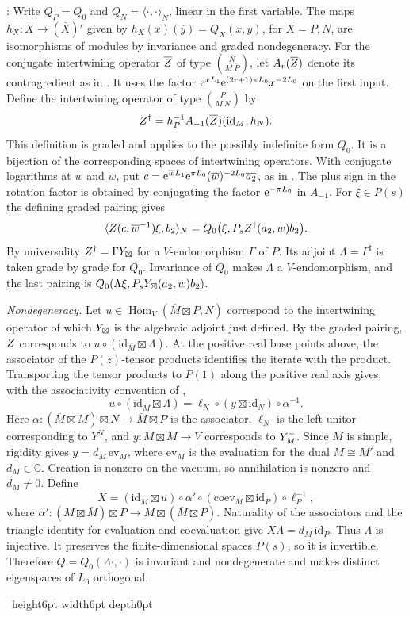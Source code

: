 \documentclass[leqno]{article}
\newcommand{\Cbb}{\ensuremath{\mathbb{C}}}
\let\cal\relax
\newcommand{\cal}{\mathcal}
\newcommand{\qed}{\hfill \vrule height6pt  width6pt depth0pt}
\newcommand{\ovl}{\overline}
\let\i\relax %
\newcommand{\i}{\mathrm{i}}
\newcommand{\e}{\mathrm{e}} %
\newenvironment{proof}[1][]{\noindent {\it Proof #1} : }{\hbox{~}\qed
\smallskip
}
\numberwithin{equation}{section}
\begin{document}
\begin{proof}
Write $Q_P=Q_0$ and $Q_N=\langle\cdot,\cdot\rangle_N$, linear in the first variable. The maps $h_X:X\to(\ovl X)'$ given by $h_X(x)(\ovl y)=Q_X(x,y)$, for $X=P,N$, are isomorphisms of modules by invariance and graded nondegeneracy. For the conjugate intertwining operator $\ovl{\cal Z}$ of type $\binom{\ovl N}{M\ \ovl P}$, let $A_r(\ovl{\cal Z})$ denote its contragredient as in \cite[(3.87) and Proposition 3.46]{HLZII}. It uses the factor $\e^{xL_1}\e^{(2r+1)\pi\i L_0}x^{-2L_0}$ on the first input. Define the intertwining operator of type $\binom{P}{M\ N}$ by
\[
\cal Z^\dagger = h_P^{-1}A_{-1}(\ovl{\cal Z})(\mathrm{id}_M,h_N).
\]
This definition is graded and applies to the possibly indefinite form $Q_0$. It is a bijection of the corresponding spaces of intertwining operators. With conjugate logarithms at $w$ and $\ovl w$, put $c=\e^{\ovl w L_1}\e^{\i\pi L_0}(\ovl w)^{-2L_0}\ovl{a_2}$, as in \cite[(3.4) and (3.6)]{Ten24}. The plus sign in the rotation factor is obtained by conjugating the factor $\e^{-\i\pi L_0}$ in $A_{-1}$. For $\xi\in P(s)$ the defining graded pairing gives
\[
\langle \cal Z(c,\ovl w^{-1})\xi,b_2\rangle_N
  =Q_0\bigl(\xi,P_s\cal Z^\dagger(a_2,w)b_2\bigr).
\]
By universality $\cal Z^\dagger=\Gamma\cal Y_\boxtimes$ for a $V$-endomorphism $\Gamma$ of $P$. Its adjoint $\Lambda=\Gamma^\sharp$ is taken grade by grade for $Q_0$. Invariance of $Q_0$ makes $\Lambda$ a $V$-endomorphism, and the last pairing is $Q_0(\Lambda\xi,P_s\cal Y_\boxtimes(a_2,w)b_2)$.

\emph{Nondegeneracy.} Let $u\in\operatorname{Hom}_V(\ovl M\boxtimes P,N)$ correspond to the intertwining operator of which $\cal Y_\boxtimes$ is the algebraic adjoint just defined. By the graded pairing, $\cal Z$ corresponds to $u\circ(\mathrm{id}_{\ovl M}\boxtimes\Lambda)$. At the positive real base points above, the associator of the $P(z)$-tensor products identifies the iterate with the product. Transporting the tensor products to $P(1)$ along the positive real axis gives, with the associativity convention of \cite[(3.21)--(3.22)]{Ten24},
\[
u\circ(\mathrm{id}_{\ovl M}\boxtimes\Lambda)
 = \ell_N\circ(y\boxtimes\mathrm{id}_N)\circ\alpha^{-1}.
\]
Here $\alpha:(\ovl M\boxtimes M)\boxtimes N\to\ovl M\boxtimes P$ is the associator, $\ell_N$ is the left unitor corresponding to $Y^N$, and $y:\ovl M\boxtimes M\to V$ corresponds to $\cal Y^-_M$. Since $M$ is simple, rigidity gives $y=d_M\,\mathrm{ev}_M$, where $\mathrm{ev}_M$ is the evaluation for the dual $\ovl M\cong M'$ and $d_M\in\Cbb$. Creation is nonzero on the vacuum, so annihilation is nonzero and $d_M\ne 0$. Define
\[
X=(\mathrm{id}_M\boxtimes u)\circ\alpha'\circ
   (\mathrm{coev}_M\boxtimes\mathrm{id}_P)\circ\ell_P^{-1},
\]
where $\alpha':(M\boxtimes\ovl M)\boxtimes P\to M\boxtimes(\ovl M\boxtimes P)$. Naturality of the associators and the triangle identity for evaluation and coevaluation give $X\Lambda=d_M\,\mathrm{id}_P$. Thus $\Lambda$ is injective. It preserves the finite-dimensional spaces $P(s)$, so it is invertible. Therefore $Q=Q_0(\Lambda\cdot,\cdot)$ is invariant and nondegenerate and makes distinct eigenspaces of $L_0$ orthogonal.


\end{proof}
\end{document}

